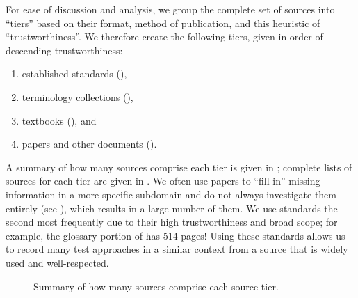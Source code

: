 For ease of discussion and analysis, we group the complete set of sources into
``tiers'' based on their format, method of publication, and this heuristic of
``trustworthiness''. We therefore create the following tiers, given in order of
descending trustworthiness:
\begin{enumerate}
    \item established standards (),
    \item terminology collections (),
    \item textbooks (), and
    \item papers and other documents ().
\end{enumerate}
A summary of how many sources comprise each tier is given in
\ifnotpaper; complete lists of sources for each tier
are given in \fi. We often use papers to ``fill in'' missing
information in a more specific subdomain and do not always investigate them
entirely (see ), which results in a large number of them. We
use standards the second most frequently due to their high trustworthiness and
broad scope; for example, the glossary portion of \citep{IEEE2017} has 514
pages! Using these standards allows us to record many test approaches in a
similar context from a source that is widely used and well-respected.

\begin{figure}[bt!]
    \centering
    \caption{Summary of how many sources comprise each source tier.}
    \label{fig:sourceSummary}
\end{figure}

\subsubsection{}
\label{stds}

